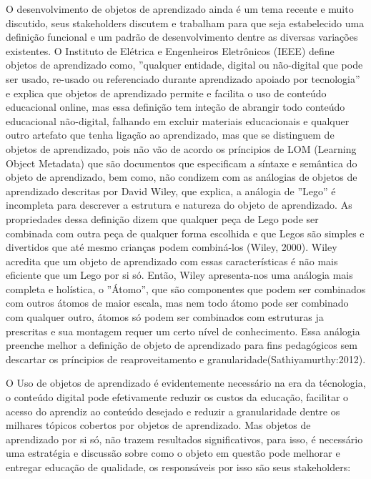 \documentclass[12pt,openright,oneside,a4paper,english,french,spanish,brazil]{unifil}
\begin{document}
O desenvolvimento de objetos de aprendizado ainda é um tema recente e muito discutido, seus stakeholders  discutem e trabalham para que seja estabelecido uma definição funcional e um padrão de desenvolvimento dentre  as diversas variações existentes. O Instituto de Elétrica e Engenheiros Eletrônicos (IEEE)  define objetos de aprendizado como, ''qualquer entidade, digital ou não-digital que pode ser usado, re-usado ou referenciado durante aprendizado apoiado por tecnologia'' e explica que objetos de aprendizado permite e facilita o uso de conteúdo educacional online, mas essa definição tem inteção de abrangir todo conteúdo educacional não-digital, falhando em excluir materiais educacionais e qualquer outro artefato que tenha ligação ao aprendizado, mas que se distinguem de objetos de aprendizado, pois não vão de acordo os príncipios de LOM (Learning Object Metadata) que são documentos que especificam a síntaxe e semântica do objeto de aprendizado, bem como, não condizem com as análogias de objetos de aprendizado descritas por David Wiley, que explica, a análogia de ''Lego'' é incompleta para descrever a estrutura e natureza do objeto de aprendizado. As propriedades dessa definição dizem que qualquer peça de Lego pode ser combinada com outra peça de qualquer forma escolhida e que Legos são simples e divertidos que até mesmo crianças podem combiná-los (Wiley, 2000). Wiley acredita que um objeto de aprendizado com essas características é não mais eficiente que um Lego por si só. Então, Wiley apresenta-nos uma análogia mais completa e holística, o ''Átomo'', que são componentes que podem ser combinados com outros átomos de maior escala, mas nem todo átomo pode ser combinado com qualquer outro, átomos só podem ser combinados com estruturas ja prescritas e sua montagem requer um certo nível de conhecimento. Essa análogia preenche melhor a definição de objeto de aprendizado para fins pedagógicos sem descartar os príncipios de reaproveitamento e granularidade(Sathiyamurthy:2012).

O Uso de objetos de aprendizado é evidentemente necessário na era da técnologia, o conteúdo digital pode efetivamente reduzir os custos da educação, facilitar o acesso do aprendiz ao conteúdo desejado e reduzir a granularidade dentre os milhares tópicos cobertos por objetos de aprendizado.
Mas objetos de aprendizado por si só, não trazem resultados significativos, para isso, é necessário uma estratégia e discussão sobre como o objeto em questão pode melhorar e entregar educação de qualidade, os responsáveis por isso são seus stakeholders:
\end{document}
